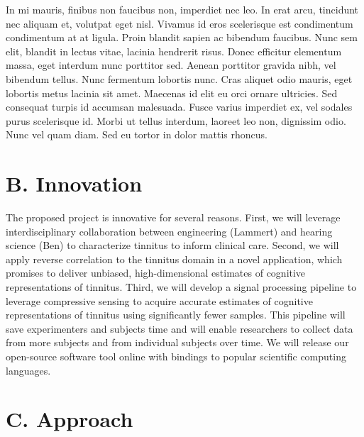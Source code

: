 \documentclass[11pt, notitlepage]{article} %
\begin{document}
In mi mauris, finibus non faucibus non, imperdiet nec leo. In erat arcu, tincidunt nec aliquam et, volutpat eget nisl. Vivamus id eros scelerisque est condimentum condimentum at at ligula. Proin blandit sapien ac bibendum faucibus. Nunc sem elit, blandit in lectus vitae, lacinia hendrerit risus. Donec efficitur elementum massa, eget interdum nunc porttitor sed. Aenean porttitor gravida nibh, vel bibendum tellus. Nunc fermentum lobortis nunc. Cras aliquet odio mauris, eget lobortis metus lacinia sit amet. Maecenas id elit eu orci ornare ultricies. Sed consequat turpis id accumsan malesuada. Fusce varius imperdiet ex, vel sodales purus scelerisque id. Morbi ut tellus interdum, laoreet leo non, dignissim odio. Nunc vel quam diam. Sed eu tortor in dolor mattis rhoncus.


\section*{B. Innovation}

The proposed project is innovative for several reasons.
First, we will leverage interdisciplinary collaboration between engineering (Lammert)
and hearing science (Ben) to characterize tinnitus to inform clinical care.
Second, we will apply reverse correlation to the tinnitus domain in a novel application,
which promises to deliver unbiased, high-dimensional estimates of cognitive representations of tinnitus.
Third, we will develop a signal processing pipeline to leverage compressive sensing
to acquire accurate estimates of cognitive representations of tinnitus using significantly fewer samples.
This pipeline will save experimenters and subjects time and will enable researchers
to collect data from more subjects and from individual subjects over time.
We will release our open-source software tool online with bindings to popular scientific computing languages.


\section*{C. Approach}
\end{document}
